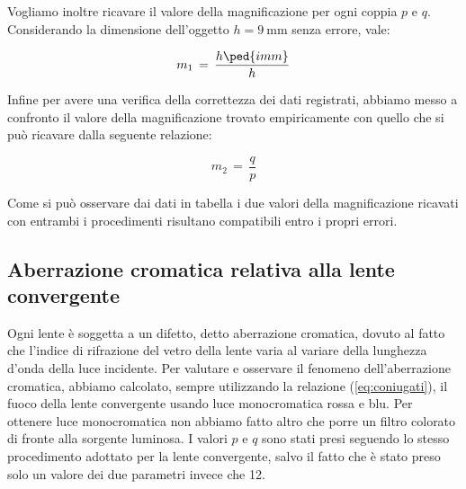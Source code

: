 Vogliamo inoltre ricavare il valore della magnificazione per ogni coppia $p$ e $q$.
Considerando la dimensione dell'oggetto $h = \SI{9}{\milli\metre}$ senza errore, vale:

\begin{equation}
	m_{1} \,=\, \frac{h \ped{imm}}{h}
\end{equation}

Infine per avere una verifica della correttezza dei dati registrati, abbiamo messo a confronto il valore della magnificazione trovato empiricamente con quello che si può ricavare dalla seguente relazione:

\begin{equation}
	m_{2} \,=\, \frac{q}{p}
\end{equation}



Come si può osservare dai dati in tabella i due valori della magnificazione ricavati con entrambi i procedimenti risultano compatibili entro i propri errori. 

\subsection{Aberrazione cromatica relativa alla lente convergente}

Ogni lente è soggetta a un difetto, detto aberrazione cromatica, dovuto al fatto che l'indice di rifrazione del vetro della lente varia al variare della lunghezza d'onda della luce incidente.
Per valutare e osservare il fenomeno dell'aberrazione cromatica, abbiamo calcolato, sempre utilizzando la relazione (\ref{eq:coniugati}), il fuoco della lente convergente usando luce monocromatica rossa e blu. Per ottenere luce monocromatica non abbiamo fatto altro che porre un filtro colorato di fronte alla sorgente luminosa. I valori $p$ e $q$ sono stati presi seguendo lo stesso procedimento adottato per la lente convergente, salvo il fatto che è stato preso solo un valore dei due parametri invece che 12.

